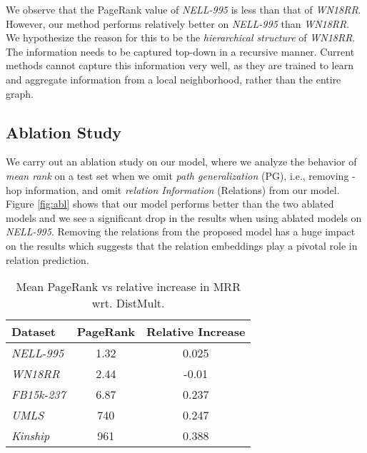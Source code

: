 \documentclass[11pt,a4paper]{article}
\begin{document}
We observe that the PageRank value of \emph{NELL-995} is less than that of \emph{WN18RR}. However, our method performs relatively better on \emph{NELL-995} than \emph{WN18RR}. We hypothesize the reason for this to be the \emph{hierarchical structure} of \emph{WN18RR}. The information needs to be captured top-down in a recursive manner. Current methods cannot capture this information very well, as they are trained to learn and aggregate information from a local neighborhood, rather than the entire graph. 
\fi

\begin{comment}
\begin{table}[t!]
\centering
\setlength{\tabcolsep}{6pt} \renewcommand{\arraystretch}{1} \begin{tabular}{l|c|c|c}
\hline
 Ablative & \multicolumn{3}{c}{NELL-995} \\
 \hline
 & 800 & 1500 & 3000 \\ 
\hline
Our model      & 1715  & 1587 & 1494   \\ 
PG        & 1778  & 1630 & 1590    \\ 
Relations & 5480  & 5346 & 5181     \\  

\hline
\end{tabular}
\caption{Comparison of our model with two ablated models: PG and Relations on test set Mean Rank (MR).  
  }
\end{table}
\end{comment}




\subsection{Ablation Study}
\label{sec:ablation}
We carry out an ablation study on our model, where we analyze the behavior of \emph{mean rank} on a test set when we omit \emph{path generalization} (PG), i.e., removing -hop information, and omit \emph{relation Information} (Relations) from our model. Figure \ref{fig:abl} shows that our model performs better than the two ablated models and we see a significant drop in the results when using ablated models on \emph{NELL-995}. Removing the relations from the proposed model has a huge impact on the results which suggests that the relation embeddings play a pivotal role in relation prediction.  

\begin{table}[t!]
\centering
\begin{tabular}{l|cc}
\textbf{Dataset}   &  \textbf{PageRank}  & \textbf{Relative Increase} \\ 
\hline
\emph{NELL-995}  & 1.32 & 0.025  \\
\emph{WN18RR}    & 2.44 & -0.01   \\ 
\emph{FB15k-237} & 6.87 & 0.237  \\ 
\emph{UMLS}      & 740    & 0.247   \\
\emph{Kinship}   & 961    & 0.388   \\
\hline
\end{tabular}
\caption{Mean PageRank  vs relative increase in MRR wrt. DistMult. 
  }\label{tb:ablation}
\end{table}
\end{document}
